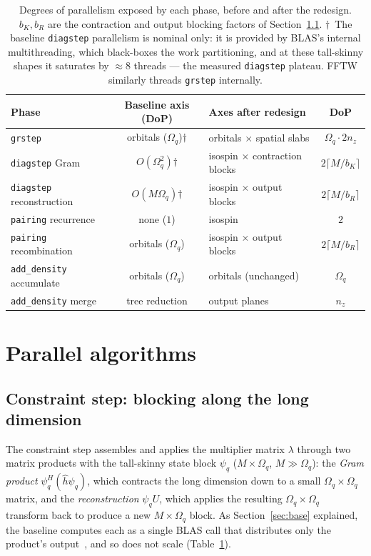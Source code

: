 \documentclass[preprint,12pt]{elsarticle}
\numberwithin{equation}{section}
\begin{document}
\begin{table}[tbp]\centering\small
\caption{Degrees of parallelism exposed by each phase, before and after the redesign. $b_K,b_R$ are the contraction and output blocking factors of Section~\ref{sec:constraint}. $\dagger$~The baseline \texttt{diagstep} parallelism is nominal only: it is provided by BLAS's internal multithreading, which black-boxes the work partitioning, and at these tall-skinny shapes it saturates by ${\approx}8$ threads --- the measured \texttt{diagstep} plateau. FFTW similarly threads \texttt{grstep} internally.}
\label{tab:dop}
\begin{tabular}{lclc}\toprule
Phase & Baseline axis (DoP) & Axes after redesign & DoP\\\midrule
\texttt{grstep} & orbitals ($\Omega_q$)$\dagger$ & orbitals $\times$ spatial slabs & $\Omega_q\cdot 2n_z$\\
\texttt{diagstep} Gram & $O(\Omega_q^2)$$\dagger$ & isospin $\times$ contraction blocks & $2\lceil M/b_K\rceil$\\
\texttt{diagstep} reconstruction & $O(M\Omega_q)$$\dagger$ & isospin $\times$ output blocks & $2\lceil M/b_R\rceil$\\
\texttt{pairing} recurrence & none ($1$) & isospin & $2$\\
\texttt{pairing} recombination & orbitals ($\Omega_q$) & isospin $\times$ output blocks & $2\lceil M/b_R\rceil$\\
\texttt{add\_density} accumulate & orbitals ($\Omega_q$) & orbitals (unchanged) & $\Omega_q$\\
\texttt{add\_density} merge & tree reduction & output planes & $n_z$\\\bottomrule
\end{tabular}
\end{table}

\section{Parallel algorithms}\label{sec:alg}

\subsection{Constraint step: blocking along the long dimension}\label{sec:constraint}
The constraint step assembles and applies the multiplier matrix $\lambda$ through two matrix products with the tall-skinny state block $\psi_q$ ($M\times\Omega_q$, $M\gg\Omega_q$): the \emph{Gram product} $\psi_q^H(\hat h\psi_q)$, which contracts the long dimension down to a small $\Omega_q\times\Omega_q$ matrix, and the \emph{reconstruction} $\psi_q U$, which applies the resulting $\Omega_q\times\Omega_q$ transform back to produce a new $M\times\Omega_q$ block. As Section~\ref{sec:base} explained, the baseline computes each as a single BLAS call that distributes only the product's output~\cite{blis-mt}, and so does not scale (Table~\ref{tab:dop}).
\end{document}
